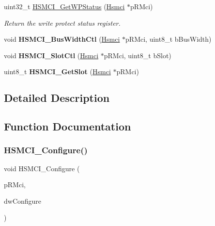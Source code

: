 \begin{DoxyCompactItemize}
uint32\+\_\+t \mbox{\hyperlink{group__hsmci__functions_ga98efe2806580596d2bc2236b52f0b7ee}{H\+S\+M\+C\+I\+\_\+\+Get\+W\+P\+Status}} (\mbox{\hyperlink{structHsmci}{Hsmci}} $\ast$p\+R\+Mci)
\begin{DoxyCompactList}\small\item\em Return the write protect status register. \end{DoxyCompactList}\item 
\mbox{\label{group__hsmci__functions_ga184370f993ec35161f86582b5d0364fc}} 
void {\bfseries H\+S\+M\+C\+I\+\_\+\+Bus\+Width\+Ctl} (\mbox{\hyperlink{structHsmci}{Hsmci}} $\ast$p\+R\+Mci, uint8\+\_\+t b\+Bus\+Width)
\item 
\mbox{\label{group__hsmci__functions_ga2a6edfb14a43d8bc53e57c5d1ab48b43}} 
void {\bfseries H\+S\+M\+C\+I\+\_\+\+Slot\+Ctl} (\mbox{\hyperlink{structHsmci}{Hsmci}} $\ast$p\+R\+Mci, uint8\+\_\+t b\+Slot)
\item 
\mbox{\label{group__hsmci__functions_ga8b2eda05f30c2dccb563023866ac8d10}} 
uint8\+\_\+t {\bfseries H\+S\+M\+C\+I\+\_\+\+Get\+Slot} (\mbox{\hyperlink{structHsmci}{Hsmci}} $\ast$p\+R\+Mci)
\end{DoxyCompactItemize}


\subsection{Detailed Description}


\subsection{Function Documentation}
\mbox{\label{group__hsmci__functions_gae212bc49645bc7b10e0f46159737f874}} 
\subsubsection{\texorpdfstring{HSMCI\_Configure()}{HSMCI\_Configure()}}
{\footnotesize\ttfamily void H\+S\+M\+C\+I\+\_\+\+Configure (\begin{DoxyParamCaption}\item[{\mbox{\hyperlink{structHsmci}{Hsmci}} $\ast$}]{p\+R\+Mci,  }\item[{uint32\+\_\+t}]{dw\+Configure }\end{DoxyParamCaption})}



